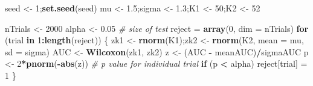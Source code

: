 \documentclass[
]{book}
\newenvironment{Shaded}{\begin{snugshade}}{\end{snugshade}}
\newcommand{\CommentTok}[1]{\textcolor[rgb]{0.56,0.35,0.01}{\textit{#1}}}
\newcommand{\ControlFlowTok}[1]{\textcolor[rgb]{0.13,0.29,0.53}{\textbf{#1}}}
\newcommand{\DataTypeTok}[1]{\textcolor[rgb]{0.13,0.29,0.53}{#1}}
\newcommand{\DecValTok}[1]{\textcolor[rgb]{0.00,0.00,0.81}{#1}}
\newcommand{\FloatTok}[1]{\textcolor[rgb]{0.00,0.00,0.81}{#1}}
\newcommand{\KeywordTok}[1]{\textcolor[rgb]{0.13,0.29,0.53}{\textbf{#1}}}
\newcommand{\NormalTok}[1]{#1}
\newcommand{\OperatorTok}[1]{\textcolor[rgb]{0.81,0.36,0.00}{\textbf{#1}}}
\newcommand{\StringTok}[1]{\textcolor[rgb]{0.31,0.60,0.02}{#1}}
\begin{document}
\begin{Shaded}
\begin{Highlighting}[]
\NormalTok{seed \textless{}{-}}\StringTok{ }\DecValTok{1}\NormalTok{;}\KeywordTok{set.seed}\NormalTok{(seed)}
\NormalTok{mu \textless{}{-}}\StringTok{ }\FloatTok{1.5}\NormalTok{;sigma \textless{}{-}}\StringTok{ }\FloatTok{1.3}\NormalTok{;K1 \textless{}{-}}\StringTok{ }\DecValTok{50}\NormalTok{;K2 \textless{}{-}}\StringTok{ }\DecValTok{52}

\NormalTok{nTrials \textless{}{-}}\StringTok{ }\DecValTok{2000}
\NormalTok{alpha \textless{}{-}}\StringTok{ }\FloatTok{0.05} \CommentTok{\# size of test}
\NormalTok{reject =}\StringTok{ }\KeywordTok{array}\NormalTok{(}\DecValTok{0}\NormalTok{, }\DataTypeTok{dim =}\NormalTok{ nTrials)}
\ControlFlowTok{for}\NormalTok{ (trial }\ControlFlowTok{in} \DecValTok{1}\OperatorTok{:}\KeywordTok{length}\NormalTok{(reject)) \{  }
\NormalTok{  zk1 \textless{}{-}}\StringTok{ }\KeywordTok{rnorm}\NormalTok{(K1);zk2 \textless{}{-}}\StringTok{ }\KeywordTok{rnorm}\NormalTok{(K2, }\DataTypeTok{mean =}\NormalTok{ mu, }\DataTypeTok{sd =}\NormalTok{ sigma)  }
\NormalTok{  AUC \textless{}{-}}\StringTok{ }\KeywordTok{Wilcoxon}\NormalTok{(zk1, zk2)  }
\NormalTok{  z \textless{}{-}}\StringTok{ }\NormalTok{(AUC }\OperatorTok{{-}}\StringTok{ }\NormalTok{meanAUC)}\OperatorTok{/}\NormalTok{sigmaAUC}
\NormalTok{  p \textless{}{-}}\StringTok{ }\DecValTok{2}\OperatorTok{*}\KeywordTok{pnorm}\NormalTok{(}\OperatorTok{{-}}\KeywordTok{abs}\NormalTok{(z)) }\CommentTok{\# p value for individual trial}
  \ControlFlowTok{if}\NormalTok{ (p }\OperatorTok{\textless{}}\StringTok{ }\NormalTok{alpha) reject[trial] =}\StringTok{ }\DecValTok{1} 
\NormalTok{\}}


\end{Highlighting}
\end{Shaded}
\end{document}
